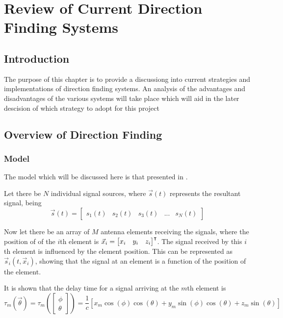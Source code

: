 \chapter{Review of Current Direction Finding Systems}

\section{Introduction}
The purpose of this chapter is to provide a discussiong into current strategies and implementations of direction finding systems. An analysis of the advantages and disadvantages of the various systems will take place which will aid in the later descision of which strategy to adopt for this project


\section{Overview of Direction Finding}
\subsection{Model}
The model which will be discussed here is that presented in \cite{poisel2012electronic}.  

Let there be $N$ individual signal sources, where $\vec{s}(t)$ represents the resultant signal, being
\begin{equation}
\vec{s}(t) = \begin{bmatrix} s_{1}(t) & s_{2}(t) & s_3(t) & ... & s_N(t) \end{bmatrix}
\end{equation}

Now let there be an array of $M$ antenna elements receiving the signals, where the position of of the \(i\)th element is \(\vec{x}_{i} = \begin{bmatrix}x_i & y_i & z_i \end{bmatrix}^\intercal\). The signal received by this \(i\)th element is influenced by the element position. This can be represented as \(\vec{s}_i(t, \vec{x}_i)\), showing that the signal at an element is a function of the position of the element.

It is shown that the delay time for a signal arriving at the \(m\)th element is
\begin{equation}
  \tau_m(\vec{\theta}) 
 = \tau_m( \begin{bmatrix} \phi \\ \theta \end{bmatrix} )
  = \frac{1}{c} [ x_m\cos(\phi)\cos(\theta) + y_m\sin(\phi)\cos(\theta) + z_m\sin(\theta) ]
\end{equation}

